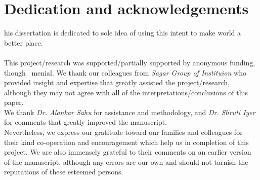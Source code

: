%
%

\chapter*{Dedication and acknowledgements}
\begin{SingleSpace}
his dissertation is dedicated to sole idea of using this intent to make world a better place.\\
  \vspace{5mm} \\
\quad  This project/research was supported/partially supported by anonymous funding, though
\   menial. We thank our colleagues from \textit{Sagar Group of Instituion} who provided insight and expertise that greatly assisted the project/research, although they may not agree with all of the interpretations/conclusions of this paper.
\vspace{10mm} \\
We thank \textit{Dr. Alankar Sahu} for assistance and methodology, and \textit{Dr. Shruti Iyer} for comments that greatly improved the manuscript.
\vspace{10mm} \\
Nevertheless, we express our gratitude toward our families and colleagues for their kind co-operation and encouragement which help us in completion of this project. We are also immensely grateful to their comments on an earlier version of the manuscript, although any errors are our own and should not tarnish the reputations of these esteemed persons.
\end{SingleSpace}
\clearpage
